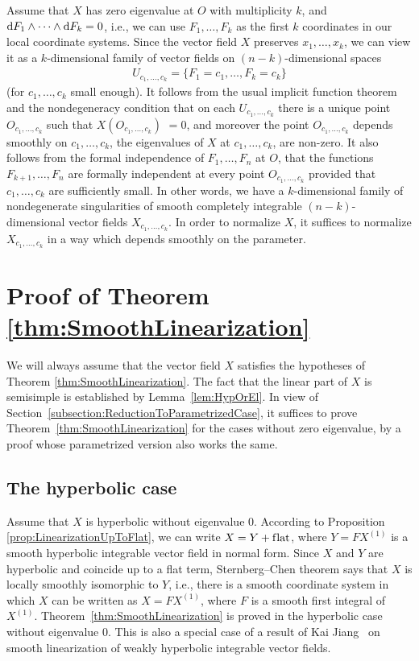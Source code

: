 \documentclass[pdftex]{sigma}
\numberwithin{equation}{section}
\begin{document}
Assume that $X$ has zero eigenvalue at $O$ with multiplicity $k$, and ${\rm d}F_1 \wedge \dots \wedge {\rm d}F_k = 0$,
i.e., we can use $F_1,\dots,F_k$ as the f\/irst $k$ coordinates in our local coordinate systems. Since
the vector f\/ield $X$ preserves $x_1,\dots,x_k$, we can view it as a $k$-dimensional family of vector f\/ields
on $(n-k)$-dimensional spaces
\begin{gather*}
 U_{c_1,\dots,c_k} = \{F_1 = c_1, \dots, F_k = c_k\}
\end{gather*}
(for $c_1,\dots,c_k$ small enough). It follows from the
usual implicit function theorem and the nondegeneracy condition
that on each $U_{c_1,\dots,c_k}$ there is a unique
point $O_{c_1,\dots,c_k}$ such that $X(O_{c_1,\dots,c_k})$ $= 0$, and moreover the point $O_{c_1,\dots,c_k}$
depends smoothly on $c_1,\dots,c_k$, the eigenvalues of $X$ at $c_1,\dots,c_k$, are non-zero.
It also follows from the formal independence of $F_1,\dots,F_n$ at $O$, that the
functions $F_{k+1},\dots,F_n$ are formally independent at every point $O_{c_1,\dots,c_k}$ provided
that $c_1,\dots,c_k$ are suf\/f\/iciently small. In other words, we have a $k$-dimensional family of nondegenerate
singularities of smooth completely integrable $(n-k)$-dimensional vector f\/ields $X_{c_1,\dots,c_k}$.
In order to normalize $X$, it suf\/f\/ices to normalize $X_{c_1,\dots,c_k}$ in a way which depends smoothly
on the parameter.

\section{Proof of Theorem \ref{thm:SmoothLinearization}}\label{section3}

We will always assume that the vector f\/ield
$X$ satisf\/ies the hypotheses of Theorem \ref{thm:SmoothLinearization}.
The fact that the linear part of $X$ is semisimple is established by Lemma~\ref{lem:HypOrEl}.
In view of Section~\ref{subsection:ReductionToParametrizedCase}, it suf\/f\/ices to prove
Theorem~\ref{thm:SmoothLinearization} for the cases without zero eigenvalue, by a proof whose
parametrized version also works the same.

\subsection{The hyperbolic case} Assume that $X$ is hyperbolic without eigenvalue 0.
According to Proposition \ref{prop:LinearizationUpToFlat}, we can write $X = Y + \text{f\/lat}$,
where $Y = FX^{(1)}$ is a smooth hyperbolic integrable vector f\/ield in normal form. Since
$X$ and $Y$ are hyperbolic and coincide up to a f\/lat term, Sternberg--Chen theorem
\cite{Chen-Vector1963, Sternberg} says that $X$ is locally smoothly isomorphic to $Y$, i.e.,
there is a smooth coordinate system in which $X$ can be written as $X = F X^{(1)}$, where $F$
is a smooth f\/irst integral of~$X^{(1)}$. Theorem~\ref{thm:SmoothLinearization} is proved in the
hyperbolic case without eigenvalue 0. This is also a special case
of a result of Kai Jiang~\cite{Jiang-WeakHyp2016} on smooth linearization of
weakly hyperbolic integrable vector f\/ields.
\end{document}
